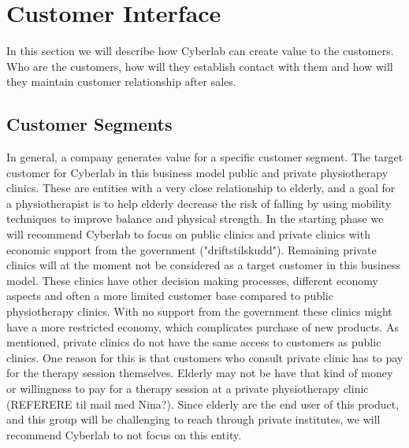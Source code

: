 \section{Customer Interface}
In this section we will describe how Cyberlab can create value to the customers. Who are the customers, how will they establish contact with them and how will they maintain customer relationship after sales.
\subsection{Customer Segments}
In general, a company generates value for a specific customer segment. The target customer for Cyberlab in this business model public and private physiotherapy clinics. These are entities with a very close relationship to elderly, and a goal for a physiotherapist is to help elderly decrease the risk of falling by using mobility techniques to improve balance and physical strength. In the starting phase we will recommend Cyberlab to focus on public clinics and private clinics with economic support from the government ("driftstilskudd"). Remaining private clinics will at the moment not be considered as a target customer in this business model. These clinics have other decision making processes, different economy aspects and often a more limited customer base compared to public physiotherapy clinics. With no support from the government these clinics might have a more restricted economy, which complicates purchase of new products. As mentioned, private clinics do not have the same access to customers as public clinics. One reason for this is that customers who consult private clinic has to pay for the therapy session themselves. Elderly may not be have that kind of money or willingness to pay for a therapy session at a private physiotherapy clinic (REFERERE til mail med Nina?). Since elderly are the end user of this product, and this group will be challenging to reach through private institutes, we will recommend Cyberlab to not focus on this entity. \\ \\
